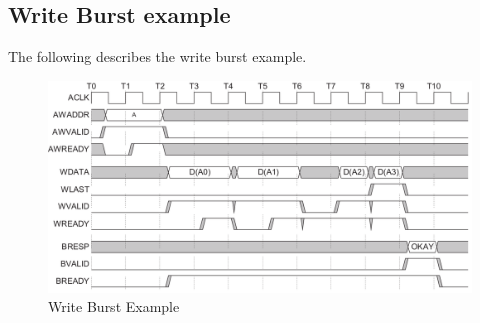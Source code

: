 \documentclass{article}
\begin{document}
\subsection{Write Burst example}
\quad The following describes the write burst example.
\begin{figure}[H]
    \centering
    \includegraphics[width=1\textwidth]{./Resources/writeBurstExample.png}    
    \caption{Write Burst Example}
\end{figure}
\end{document}
